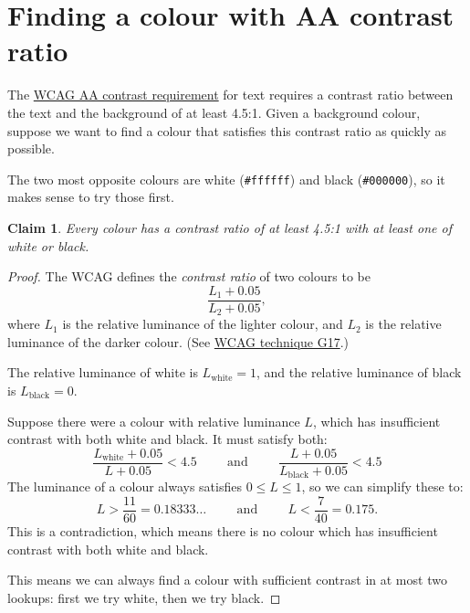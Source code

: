 \documentclass[12pt]{article}
\newtheorem*{claim}{Claim}
\begin{document}
  \section*{Finding a colour with AA contrast ratio} %
  \label{sec:the_problem}

  The \href{https://www.w3.org/TR/2008/REC-WCAG20-20081211/#visual-audio-contrast-contrast}{WCAG AA contrast requirement} for text requires a contrast ratio between the text and the background of at least 4.5:1.
  Given a background colour, suppose we want to find a colour that satisfies this contrast ratio as quickly as possible.

  The two most opposite colours are white (\texttt{\#ffffff}) and black (\texttt{\#000000}), so it makes sense to try those first.

  \begin{claim}
    Every colour has a contrast ratio of at least 4.5:1 with at least one of white  or black.
  \end{claim}

  \begin{proof}
    The WCAG defines the \emph{contrast ratio} of two colours to be
    \begin{equation*}
      \frac{L_1 + 0.05}{L_2 + 0.05},
    \end{equation*}
    where $L_1$ is the relative luminance of the lighter colour, and $L_2$ is the relative luminance of the darker colour.
    (See \href{https://www.w3.org/TR/WCAG20-TECHS/G17.html}{WCAG technique G17}.)

    The relative luminance of white is $L_\text{white} = 1$, and the relative luminance of black is $L_\text{black} = 0$.

    Suppose there were a colour with relative luminance $L$, which has insufficient contrast with both white and black.
    It must satisfy both:
    \begin{equation*}
      \frac{L_\text{white} + 0.05}{L + 0.05} < 4.5
      \hspace{1cm} \text{and} \hspace{1cm}
      \frac{L + 0.05}{L_\text{black} + 0.05} < 4.5
    \end{equation*}
    The luminance of a colour always satisfies $0 \leq L \leq 1$, so we can simplify these to:
    \begin{equation*}
      L > \frac{11}{60} = 0.18333\ldots
      \hspace{1cm} \text{and} \hspace{1cm}
      L < \frac{7}{40} = 0.175.
    \end{equation*}
    This is a contradiction, which means there is no colour which has insufficient contrast with both white and black.

    This means we can always find a colour with sufficient contrast in at most two lookups: first we try white, then we try black.
  \end{proof}
\end{document}
